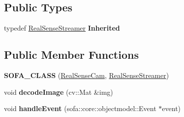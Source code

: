 \subsection*{Public Types}
\begin{DoxyCompactItemize}
\item 
\mbox{\label{classsofa_1_1rgbdtracking_1_1_real_sense_cam_a0a77e286d896d3e917359d3e7a3d6c47}} 
typedef \hyperlink{classsofa_1_1rgbdtracking_1_1_real_sense_streamer}{Real\+Sense\+Streamer} {\bfseries Inherited}
\end{DoxyCompactItemize}
\subsection*{Public Member Functions}
\begin{DoxyCompactItemize}
\item 
\mbox{\label{classsofa_1_1rgbdtracking_1_1_real_sense_cam_a32f3a2ac2480dba52c84620583c4d6e3}} 
{\bfseries S\+O\+F\+A\+\_\+\+C\+L\+A\+SS} (\hyperlink{classsofa_1_1rgbdtracking_1_1_real_sense_cam}{Real\+Sense\+Cam}, \hyperlink{classsofa_1_1rgbdtracking_1_1_real_sense_streamer}{Real\+Sense\+Streamer})
\item 
\mbox{\label{classsofa_1_1rgbdtracking_1_1_real_sense_cam_af0fc64dd75ab34819f1341ce97359634}} 
void {\bfseries decode\+Image} (cv\+::\+Mat \&img)
\item 
\mbox{\label{classsofa_1_1rgbdtracking_1_1_real_sense_cam_abf95b6b7d177c8718c779947e1a19bdc}} 
void {\bfseries handle\+Event} (sofa\+::core\+::objectmodel\+::\+Event $\ast$event)
\end{DoxyCompactItemize}
